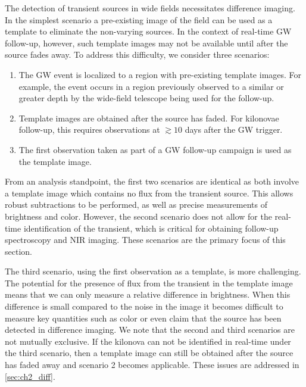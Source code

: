 The detection of transient sources in wide fields necessitates difference imaging. In the simplest scenario a pre-existing image of the field can be used as a template to eliminate the non-varying sources. In the context of real-time GW follow-up, however, such template images may not be available until after the source fades away. To address this difficulty, we consider three scenarios:
\begin{enumerate}
\item The GW event is localized to a region with pre-existing template images. For example, the event occurs in a region previously observed to a similar or greater depth by the wide-field telescope being used for the follow-up.
\item Template images are obtained after the source has faded. For kilonovae follow-up, this requires observations at $\gtrsim10$ days after the GW trigger.
\item The first observation taken as part of a GW follow-up campaign is used as the template image.
\end{enumerate}

From an analysis standpoint, the first two scenarios are identical as both involve a template image which contains no flux from the transient source. This allows robust subtractions to be performed, as well as precise measurements of brightness and color. However, the second scenario does not allow for the real-time identification of the transient, which is critical for obtaining follow-up spectroscopy and NIR imaging. These scenarios are the primary focus of this section.

The third scenario, using the first observation as a template, is more challenging. The potential for the presence of flux from the transient in the template image means that we can only measure a relative difference in brightness. When this difference is small compared to the noise in the image it becomes difficult to measure key quantities such as color or even claim that the source has been detected in difference imaging. We note that the second and third scenarios are not mutually exclusive. If the kilonova can not be identified in real-time under the third scenario, then a template image can still be obtained after the source has faded away and scenario 2 becomes applicable. These issues are addressed in \autoref{sec:ch2_diff}.

